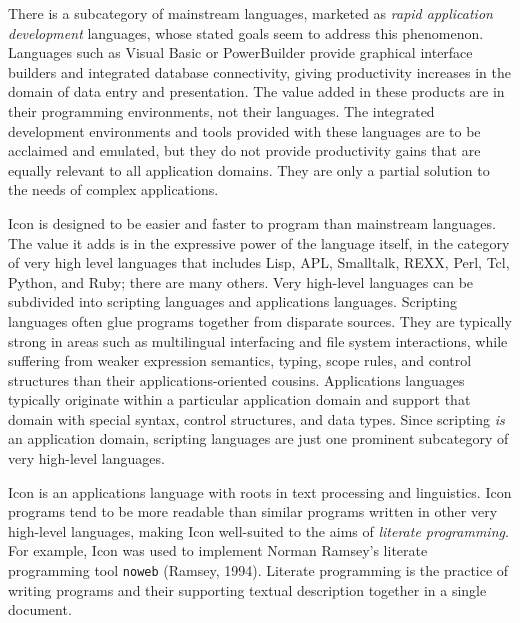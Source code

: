 There is a subcategory of mainstream languages, marketed as \textit{rapid application development}
languages, whose stated goals seem to address this phenomenon.
Languages such as Visual Basic or
PowerBuilder provide
graphical interface builders and integrated database connectivity,
giving productivity increases in the domain of data entry and
presentation. The value added in these products are in their
programming environments, not their languages. The integrated development environments and tools
provided with these languages are to be acclaimed and emulated, but
they do not provide productivity gains that are equally relevant to all
application domains. They are only a partial solution to the needs of
complex applications.

Icon is designed to be easier and faster to program than mainstream
languages. The value it adds is in the expressive power of the language
itself, in the category of very high level languages
that includes Lisp,
APL, Smalltalk, REXX,
Perl, Tcl, Python, and
Ruby; there are
many others. Very high-level languages can be subdivided into
scripting languages and applications
languages. Scripting languages often glue programs
together from disparate sources. They are typically strong in areas
such as multilingual interfacing and file system interactions, while
suffering from weaker expression semantics, typing, scope rules, and
control structures than their applications-oriented cousins.
Applications languages typically originate within a particular
application domain and support that domain with special syntax, control
structures, and data types. Since scripting \textit{is} an application
domain, scripting languages are just one prominent
subcategory of very high-level languages.

Icon is an applications language with roots in text
processing and linguistics. Icon programs tend to be more readable than
similar programs written in other very high-level languages, making
Icon well-suited to the aims of \textit{literate programming}. For example, Icon was used
to implement Norman Ramsey's literate
programming tool \texttt{noweb} (Ramsey, 1994). Literate programming is
the practice of writing programs and their supporting textual
description together in a single document.

